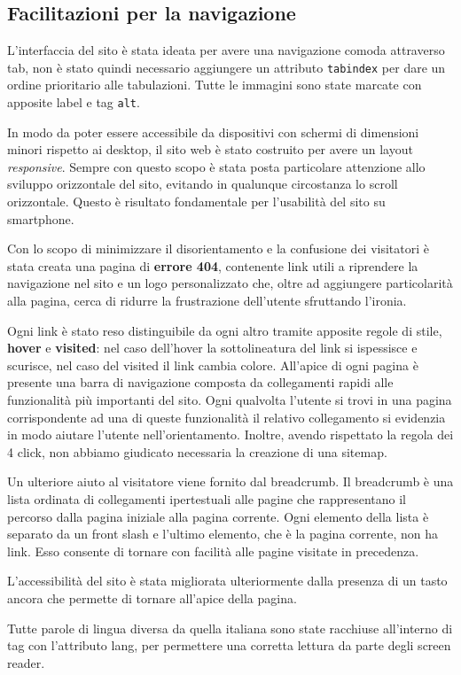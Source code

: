	\subsection{Facilitazioni per la navigazione}
	\par L’interfaccia del sito è stata ideata per avere una navigazione comoda attraverso tab, non è stato quindi necessario aggiungere un attributo \texttt{tabindex} per dare un ordine prioritario alle tabulazioni. Tutte le immagini sono state marcate con apposite label e tag \texttt{alt}.
	\par In modo da poter essere accessibile da dispositivi con schermi di dimensioni minori rispetto ai desktop, il sito web è stato costruito per avere un layout \textit{responsive}. Sempre con questo scopo è stata posta particolare attenzione allo sviluppo orizzontale del sito, evitando in qualunque circostanza lo scroll orizzontale. Questo è risultato fondamentale per l’usabilità del sito su smartphone.
	\par Con lo scopo di minimizzare il disorientamento e la confusione dei visitatori è stata creata una pagina di \textbf{errore 404}, contenente link utili a riprendere la navigazione nel sito e un logo personalizzato che, oltre ad aggiungere particolarità alla pagina, cerca di ridurre la frustrazione dell’utente sfruttando l’ironia.
	\par Ogni link è stato reso distinguibile da ogni altro tramite apposite regole di stile, \textbf{hover} e \textbf{visited}: nel caso dell’hover la sottolineatura del link si ispessisce e scurisce, nel caso del visited il link cambia colore. All’apice di ogni pagina è presente una barra di navigazione composta da collegamenti rapidi alle funzionalit\`a pi\`u importanti del sito. Ogni qualvolta l’utente si trovi in una pagina corrispondente ad una di queste funzionalit\`a il relativo collegamento si evidenzia in modo aiutare l'utente nell'orientamento. Inoltre, avendo rispettato la regola dei 4 click, non abbiamo giudicato necessaria la creazione di una sitemap.
	\par Un ulteriore aiuto al visitatore viene fornito dal breadcrumb. Il breadcrumb \`e una lista ordinata di collegamenti ipertestuali alle pagine che rappresentano il percorso dalla pagina iniziale alla pagina corrente. Ogni elemento della lista \`e separato da un front slash e l’ultimo elemento, che è la pagina corrente, non ha link. Esso consente di tornare con facilità alle pagine visitate in precedenza.
	\par L’accessibilità del sito è stata migliorata ulteriormente dalla presenza di un tasto ancora che permette di tornare all’apice della pagina.
  \par Tutte parole di lingua diversa da quella italiana sono state racchiuse all’interno di tag con l’attributo lang, per permettere una corretta lettura da parte degli screen reader.
